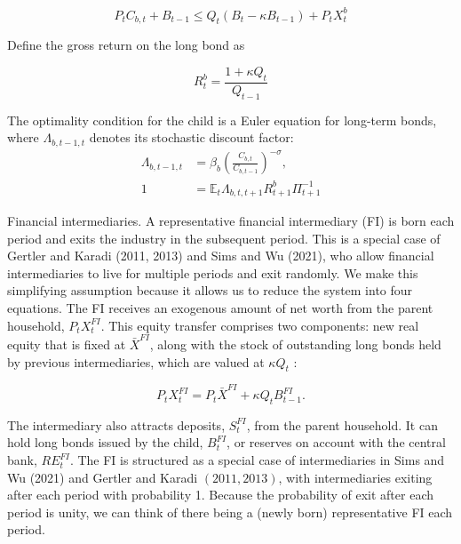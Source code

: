 \documentclass[10pt]{article}
\begin{document}
\begin{equation*}
P_{t} C_{b, t}+B_{t-1} \leq Q_{t}\left(B_{t}-\kappa B_{t-1}\right)+P_{t} X_{t}^{b} \tag{11}
\end{equation*}

Define the gross return on the long bond as

\begin{equation*}
R_{t}^{b}=\frac{1+\kappa Q_{t}}{Q_{t-1}} \tag{12}
\end{equation*}

The optimality condition for the child is a Euler equation for long-term bonds, where $\Lambda_{b, t-1, t}$ denotes its stochastic discount factor:\\
\begin{align*}
\Lambda_{b, t-1, t} & =\beta_{b}\left(\frac{C_{b, t}}{C_{b, t-1}}\right)^{-\sigma},  \tag{13}\\
1 & =\mathbb{E}_{t} \Lambda_{b, t, t+1} R_{t+1}^{b} \Pi_{t+1}^{-1} \tag{14}
\end{align*}

Financial intermediaries. A representative financial intermediary (FI) is born each period and exits the industry in the subsequent period. This is a special case of Gertler and Karadi (2011, 2013) and Sims and Wu (2021), who allow financial intermediaries to live for multiple periods and exit randomly. We make this simplifying assumption because it allows us to reduce the system into four equations. The FI receives an exogenous amount of net worth from the parent household, $P_{t} X_{t}^{F I}$. This equity transfer comprises two components: new real equity that is fixed at $\bar{X}^{F I}$, along with the stock of outstanding long bonds held by previous intermediaries, which are valued at $\kappa Q_{t}$ :

\begin{equation*}
P_{t} X_{t}^{F I}=P_{t} \bar{X}^{F I}+\kappa Q_{t} B_{t-1}^{F I} . \tag{15}
\end{equation*}

The intermediary also attracts deposits, $S_{t}^{F I}$, from the parent household. It can hold long bonds issued by the child, $B_{t}^{F I}$, or reserves on account with the central bank, $R E_{t}^{F I}$. The FI is structured as a special case of intermediaries in Sims and Wu (2021) and Gertler and Karadi $(2011,2013)$, with intermediaries exiting after each period with probability 1. Because the probability of exit after each period is unity, we can think of there being a (newly born) representative FI each period.
\end{document}
